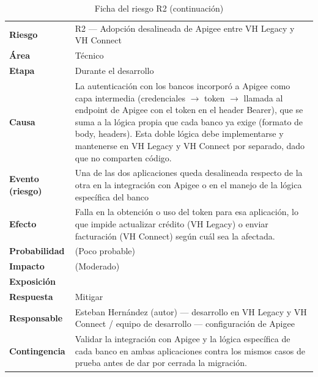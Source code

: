 \begin{longtable}[]{@{}
  >{\raggedright\arraybackslash}p{}
  >{\raggedright\arraybackslash}p{}@{}}
\caption{Ficha del riesgo R2}\label{tab:6}\\
\toprule\noalign{}
\endfirsthead
\caption[]{Ficha del riesgo R2 (continuación)}\\
\toprule\noalign{}
\endhead
\bottomrule\noalign{}
\endlastfoot
\textbf{Riesgo} & R2 --- Adopción desalineada de Apigee entre VH Legacy y VH Connect \\
\textbf{Área} & Técnico \\
\textbf{Etapa} & Durante el desarrollo \\
\textbf{Causa} & La autenticación con los bancos incorporó a Apigee como capa intermedia (credenciales $\rightarrow$ token $\rightarrow$ llamada al endpoint de Apigee con el token en el header Bearer), que se suma a la lógica propia que cada banco ya exige (formato de body, headers). Esta doble lógica debe implementarse y mantenerse en VH Legacy y VH Connect por separado, dado que no comparten código. \\
\textbf{Evento (riesgo)} & Una de las dos aplicaciones queda desalineada respecto de la otra en la integración con Apigee o en el manejo de la lógica específica del banco \\
\textbf{Efecto} & Falla en la obtención o uso del token para esa aplicación, lo que impide actualizar crédito (VH Legacy) o enviar facturación (VH Connect) según cuál sea la afectada. \\
\textbf{Probabilidad} & 2 (Poco probable) \\
\textbf{Impacto} & 3 (Moderado) \\
\textbf{Exposición} & 6 \\
\textbf{Respuesta} & Mitigar \\
\textbf{Responsable} & Esteban Hernández (autor) --- desarrollo en VH Legacy y VH Connect / equipo de desarrollo --- configuración de Apigee \\
\textbf{Contingencia} & Validar la integración con Apigee y la lógica específica de cada banco en ambas aplicaciones contra los mismos casos de prueba antes de dar por cerrada la migración. \\
\end{longtable}

